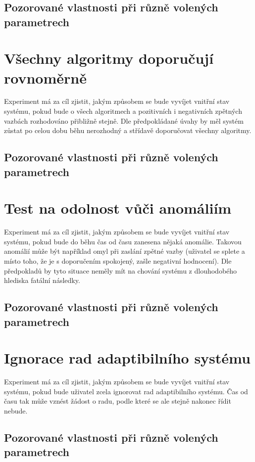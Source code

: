 \documentclass[thesis=M,czech]{FITthesis}[2014/05/07]
\begin{document}
\subsection{Pozorované vlastnosti při různě volených parametrech}

\section{Všechny algoritmy doporučují rovnoměrně}
Experiment má za cíl zjistit, jakým způsobem se bude vyvíjet vnitřní stav systému, pokud bude o všech algoritmech a pozitivních i negativních zpětných vazbách rozhodováno přibližně stejně. Dle předpokládané úvahy by měl systém zůstat po celou dobu běhu nerozhodný a střídavě doporučovat všechny algoritmy.

\subsection{Pozorované vlastnosti při různě volených parametrech}

\section{Test na odolnost vůči anomáliím}
Experiment má za cíl zjistit, jakým způsobem se bude vyvíjet vnitřní stav systému, pokud bude do běhu čas od času zanesena nějaká anomálie. Takovou anomálií může být například omyl při zaslání zpětné vazby (uživatel se splete a místo toho, že je s doporučením spokojený, zašle negativní hodnocení). Dle předpokladů by tyto situace neměly mít na chování systému z dlouhodobého hlediska fatální následky.

\subsection{Pozorované vlastnosti při různě volených parametrech}

\section{Ignorace rad adaptibilního systému}
Experiment má za cíl zjistit, jakým způsobem se bude vyvíjet vnitřní stav systému, pokud bude uživatel zcela ignorovat rad adaptibilního systému. Čas od času tak může vznést žádost o radu, podle které se ale stejně nakonec řídit nebude.

\subsection{Pozorované vlastnosti při různě volených parametrech}
\end{document}
